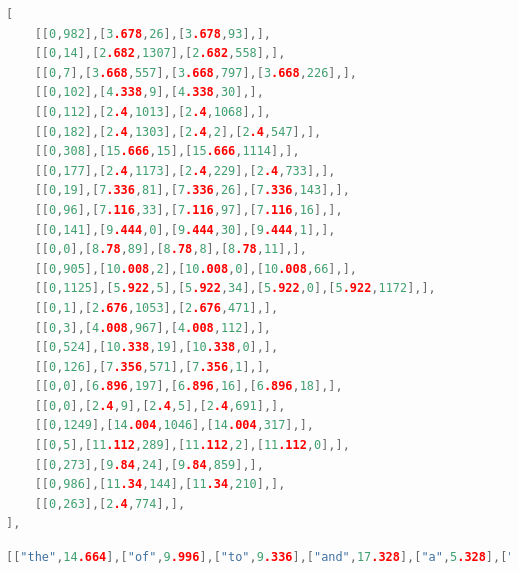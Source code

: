 \begin{lstlisting}[label=lst:deltasdata,captionpos=b,float,language=c,stringstyle=\color{blue},basicstyle=\ttfamily\footnotesize,caption={[Excerpt from a paragraph tree using position deltas]Excerpt from a JavaScript data file that uses position deltas in the document structure tree, representing one galley rendering of one paragraph.}]
[
    [[0,982],[3.678,26],[3.678,93],],
    [[0,14],[2.682,1307],[2.682,558],],
    [[0,7],[3.668,557],[3.668,797],[3.668,226],],
    [[0,102],[4.338,9],[4.338,30],],
    [[0,112],[2.4,1013],[2.4,1068],],
    [[0,182],[2.4,1303],[2.4,2],[2.4,547],],
    [[0,308],[15.666,15],[15.666,1114],],
    [[0,177],[2.4,1173],[2.4,229],[2.4,733],],
    [[0,19],[7.336,81],[7.336,26],[7.336,143],],
    [[0,96],[7.116,33],[7.116,97],[7.116,16],],
    [[0,141],[9.444,0],[9.444,30],[9.444,1],],
    [[0,0],[8.78,89],[8.78,8],[8.78,11],],
    [[0,905],[10.008,2],[10.008,0],[10.008,66],],
    [[0,1125],[5.922,5],[5.922,34],[5.922,0],[5.922,1172],],
    [[0,1],[2.676,1053],[2.676,471],],
    [[0,3],[4.008,967],[4.008,112],],
    [[0,524],[10.338,19],[10.338,0],],
    [[0,126],[7.356,571],[7.356,1],],
    [[0,0],[6.896,197],[6.896,16],[6.896,18],],
    [[0,0],[2.4,9],[2.4,5],[2.4,691],],
    [[0,1249],[14.004,1046],[14.004,317],],
    [[0,5],[11.112,289],[11.112,2],[11.112,0],],
    [[0,273],[9.84,24],[9.84,859],],
    [[0,986],[11.34,144],[11.34,210],],
    [[0,263],[2.4,774],],
],
\end{lstlisting}

\begin{lstlisting}[label=lst:deltasdict,captionpos=b,float,language=c,stringstyle=\color{blue},basicstyle=\ttfamily\footnotesize,caption={[Excerpt from a dictionary storing word widths]Excerpt from the dictionary from a JavaScript data file that uses position deltas, where the width of each word is stored alongside the word itself.}]
 [["the",14.664],["of",9.996],["to",9.336],["and",17.328],["a",5.328],["is",8.004],["be",11.328],["in",9.336],["as",9.996],["document",47.328],["that",18],["it",6.672],["page",22.656],["for",13.992],["are",14.652],["by",12],["on",12],["will",18.672],["which",29.328],["with",21.336],["this",17.34],["The",18.66],["can",16.656],["an",11.328],["or",9.996],["-",3.996],["eBook",31.332],["used",21.996],["PDF",22.008],["In",9.996],["layout",30],["have",22.656],["from",23.328],["not",15.336],["at",8.664],["width",27.336],["This",21.336],["has",15.996],["then",20.664],["each",21.984],["was",18.66],["typesetting",52.668],["columns",40.668],["simply",32.676],["these",24.66],["text",18],["into",18.672],["hyphenation",59.328],["content",35.328],["quality",33.336],["column",36],["lines",22.668],["only",21.336],["line",18],["ACM",27.336],["our",15.996],["its",11.34],["structure",41.988],["Document",49.992],["penalty",35.328],["between",39.984],["galley",29.328],["order",25.32],["more",24.66],["COGs",30],["out",15.336],["end",17.328],["one",17.328],["use",15.996],["algorithm",46.668],["producing",48.66],["columns.",43.668],["galleys",33.996],["figure",28.656],["simple",32.004],["would",30],
\end{lstlisting}

